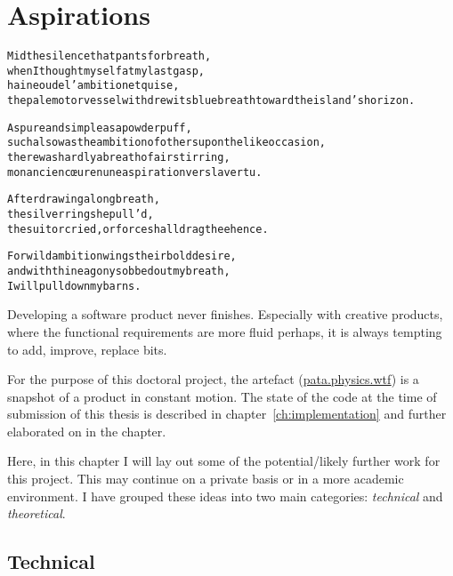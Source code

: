
\chapter{Aspirations}
\label{ch:future}

\startcontents[chapters]

\vfill

\begin{alltt}\sffamily
Mid the silence that pants for breath,
when I thought myself at my last gasp,
haine ou de l'ambition et qui se,
the pale motor vessel withdrew its blue breath toward the island's horizon.

As pure and simple as a powder puff,
such also was the ambition of others upon the like occasion,
there was hardly a breath of air stirring,
mon ancien cœur en une aspiration vers la vertu.

After drawing a long breath,
the silver ring she pull'd,
the suitor cried, or force shall drag thee hence.

For wild ambition wings their bold desire,
and with thine agony sobbed out my breath,
I will pull down my barns.
\end{alltt}

\newpage
\minicontents
\spirals


Developing a software product never finishes. Especially with creative products, where the functional requirements are more fluid perhaps, it is always tempting to add, improve, replace bits. 

For the purpose of this doctoral project, the artefact (\url{pata.physics.wtf}) is a snapshot of a product in constant motion. The state of the code at the time of submission of this thesis is described in chapter~\ref{ch:implementation} and further elaborated on in the  chapter.

Here, in this chapter I will lay out some of the potential/likely further work for this project. This may continue on a private basis or in a more academic environment. I have grouped these ideas into two main categories: \emph{technical} and \emph{theoretical}. 


\section{Technical}



